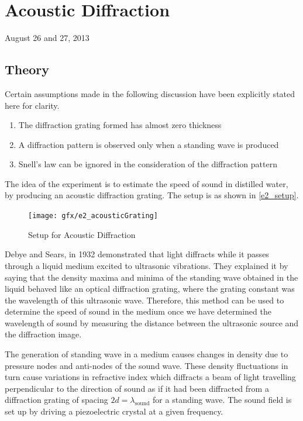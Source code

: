 \chapter{Acoustic Diffraction}
\begin{flushright}
August 26 and 27, 2013 \\
\end{flushright}

\section{Theory}
	Certain assumptions made in the following discussion have been explicitly stated here for clarity.
	\begin{enumerate}
		\item The diffraction grating formed has almost zero thickness
		\item A diffraction pattern is observed only when a standing wave is produced
		\item Snell's law can be ignored in the consideration of the diffraction pattern
	\end{enumerate}
	The idea of the experiment is to estimate the speed of sound in distilled water, by producing an acoustic diffraction grating. The setup is as shown in \autoref{e2_setup}.

	\begin{figure}[bth]
		\begin{center}
			\texttt{[image: gfx/e2\_acousticGrating]}
		\end{center}
		\caption[Setup for Acoustic Diffraction]{Setup for Acoustic Diffraction}
	\label{e2_setup}
	\end{figure}

	Debye and Sears, in 1932 demonstrated that light diffracts while it passes through a liquid medium excited to ultrasonic vibrations. They explained it by saying that the density maxima and minima of the standing wave obtained in the liquid behaved like an optical diffraction grating, where the grating constant was the wavelength of this ultrasonic wave. Therefore, this method can be used to determine the speed of sound in the medium once we have determined the wavelength of sound by measuring the distance between the ultrasonic source and the diffraction image.

	The generation of standing wave in a medium causes changes in density due to pressure nodes and anti-nodes of the sound wave. These density fluctuations in turn cause variations in refractive index which diffracts a beam of light travelling perpendicular to the direction of sound as if it had been diffracted from a diffraction grating of spacing $2d=\lambda_\text{sound}$ for a standing wave. The sound field is set up by driving a piezoelectric crystal at a given frequency.

